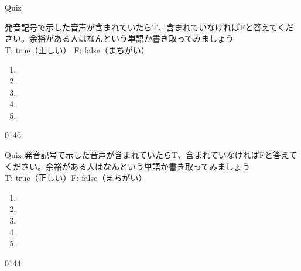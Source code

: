 \documentclass[aspectratio=169,xcolor={dvipsnames,table}]{beamer}
\begin{document}
\begin{frame}[plain]{Quiz }

\large
発音記号で示した音声が含まれていたらT、含まれていなければFと答えてください。余裕がある人はなんという単語か書き取ってみましょう\\
\hfill{}{\scriptsize T: true（正しい）\hspace{5pt} F: false（まちがい）}
 \begin{enumerate}
  \item \mbox{}\hspace{1\zw}
  \item \mbox{}\hspace{1\zw}
  \item \mbox{}\visible<4->{T}\hspace{1\zw}
  \item \mbox{}\hspace{1\zw}
  \item \mbox{}\hspace{1\zw}
 \end{enumerate}

\hfill{\tiny 0146}\,{\scriptsize {}}
\end{frame}
\begin{frame}[plain]{Quiz }
\large
発音記号で示した音声が含まれていたらT、含まれていなければFと答えてください。余裕がある人はなんという単語か書き取ってみましょう\\
\hfill{}{\scriptsize T: true（正しい）\hspace{5pt}F: false（まちがい）}
 \begin{enumerate}
  \item \mbox{}\visible<2->{T}\hspace{1\zw}
  \item \mbox{}\hspace{1\zw}
  \item \mbox{}\visible<4->{F}\hspace{1\zw}
  \item \mbox{}\hspace{1\zw}
  \item \mbox{}\hspace{1\zw}
 \end{enumerate}

\hfill{\tiny 0144}\,{\scriptsize {}}
\end{frame}
\end{document}
